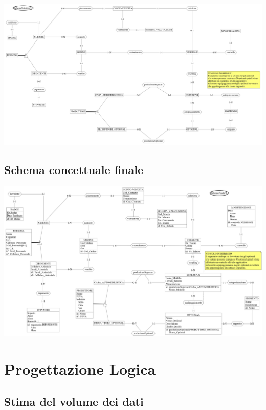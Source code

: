 \documentclass[12pt]{article}
\begin{document}
\begin{center}
    \includegraphics[scale=0.75, angle=90]{images/schemaScheletro.png}
\end{center}

\newpage

\subsection{Schema concettuale finale}
\begin{center}
    \includegraphics[scale=0.85, angle=90]{images/schemaFinale.png}
\end{center}

\newpage

\section{Progettazione Logica}

\subsection{Stima del volume dei dati}
\end{document}
